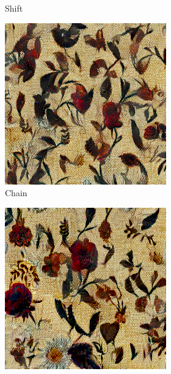 \begin{figure}[ht]
\begin{subfigure}{0.8\textwidth}
\begin{subfigure}{0.32\textwidth}
            \caption{Shift}
            \label{fig:methods_comparison_large-shift}
        \end{subfigure}
        
        \begin{subfigure}{0.32\textwidth}
            \centering
            \includegraphics[width=\textwidth]{images/03-comparison_large_chain.jpg}
            \caption{Chain}
            \label{fig:methods_comparison_large-chain}
        \end{subfigure}
        \hfill
        \begin{subfigure}{0.32\textwidth}
            \centering
            \includegraphics[width=\textwidth]{images/03-comparison_large_pyramid.jpg}

\end{subfigure}
\end{subfigure}
\end{figure}

